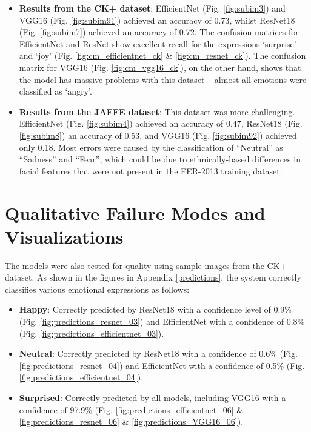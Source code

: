 \begin{itemize}
	\item \textbf{Results from the CK+ dataset}:  EfficientNet (Fig. \ref{fig:subim3}) and VGG16 (Fig. \ref{fig:subim91}) achieved an accuracy of 0.73, whilst ResNet18 (Fig. \ref{fig:subim7}) achieved an accuracy of 0.72. The confusion matrices for EfficientNet and ResNet show excellent recall for the expressions ‘surprise’ and ‘joy’ (Fig. \ref{fig:cm_efficientnet_ck} \& \ref{fig:cm_resnet_ck}). The confusion matrix for VGG16 (Fig. \ref{fig:cm_vgg16_ck}), on the other hand, shows that the model has massive problems with this dataset – almost all emotions were classified as ‘angry’.
	\item \textbf{Results from the JAFFE dataset}: This dataset was more challenging. EfficientNet (Fig. \ref{fig:subim4}) achieved an accuracy of 0.47, ResNet18 (Fig. \ref{fig:subim8}) an accuracy of 0.53, and VGG16 (Fig. \ref{fig:subim92}) achieved only 0.18. Most errors were caused by the classification of “Neutral” as “Sadness” and “Fear”, which could be due to ethnically-based differences in facial features that were not present in the FER-2013 training dataset.
\end{itemize}

\section{Qualitative Failure Modes and Visualizations}

The models were also tested for quality using sample images from the CK+ dataset. As shown in the figures in Appendix \ref{predictions}, the system correctly classifies various emotional expressions as follows:

\begin{itemize}
	\item \textbf{Happy}: Correctly predicted by ResNet18 with a confidence level of 0.9\% (Fig. \ref{fig:predictions_resnet_03}) and EfficientNet with a confidence of 0.8\% (Fig. \ref{fig:predictions_efficientnet_03}).
	\item \textbf{Neutral}: Correctly predicted by ResNet18 with a confidence of 0.6\% (Fig. \ref{fig:predictions_resnet_04}) and EfficientNet with a confidence of 0.5\% (Fig. \ref{fig:predictions_efficientnet_04}).
	\item \textbf{Surprised}: Correctly predicted by all models, including VGG16 with a confidence of 97.9\% (Fig. \ref{fig:predictions_efficientnet_06} \& \ref{fig:predictions_resnet_06} \& \ref{fig:predictions_VGG16_06}).
\end{itemize}

